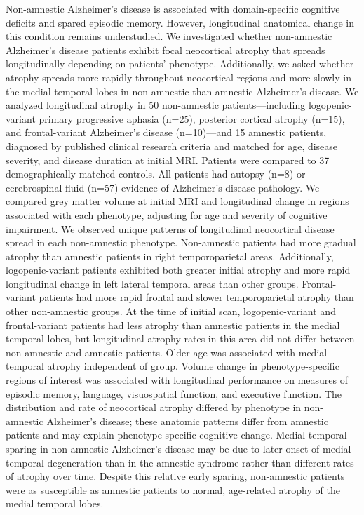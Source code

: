 \documentclass[]{article}
\begin{document}
Non-amnestic Alzheimer's disease is associated with domain-specific
cognitive deficits and spared episodic memory. However, longitudinal
anatomical change in this condition remains understudied. We
investigated whether non-amnestic Alzheimer's disease patients exhibit
focal neocortical atrophy that spreads longitudinally depending on
patients' phenotype. Additionally, we asked whether atrophy spreads more
rapidly throughout neocortical regions and more slowly in the medial
temporal lobes in non-amnestic than amnestic Alzheimer's disease. We
analyzed longitudinal atrophy in 50 non-amnestic patients---including
logopenic-variant primary progressive aphasia (n=25), posterior cortical
atrophy (n=15), and frontal-variant Alzheimer's disease (n=10)---and 15
amnestic patients, diagnosed by published clinical research criteria and
matched for age, disease severity, and disease duration at initial MRI.
Patients were compared to 37 demographically-matched controls. All
patients had autopsy (n=8) or cerebrospinal fluid (n=57) evidence of
Alzheimer's disease pathology. We compared grey matter volume at initial
MRI and longitudinal change in regions associated with each phenotype,
adjusting for age and severity of cognitive impairment. We observed
unique patterns of longitudinal neocortical disease spread in each
non-amnestic phenotype. Non-amnestic patients had more gradual atrophy
than amnestic patients in right temporoparietal areas. Additionally,
logopenic-variant patients exhibited both greater initial atrophy and
more rapid longitudinal change in left lateral temporal areas than other
groups. Frontal-variant patients had more rapid frontal and slower
temporoparietal atrophy than other non-amnestic groups. At the time of
initial scan, logopenic-variant and frontal-variant patients had less
atrophy than amnestic patients in the medial temporal lobes, but
longitudinal atrophy rates in this area did not differ between
non-amnestic and amnestic patients. Older age was associated with medial
temporal atrophy independent of group. Volume change in
phenotype-specific regions of interest was associated with longitudinal
performance on measures of episodic memory, language, visuospatial
function, and executive function. The distribution and rate of
neocortical atrophy differed by phenotype in non-amnestic Alzheimer's
disease; these anatomic patterns differ from amnestic patients and may
explain phenotype-specific cognitive change. Medial temporal sparing in
non-amnestic Alzheimer's disease may be due to later onset of medial
temporal degeneration than in the amnestic syndrome rather than
different rates of atrophy over time. Despite this relative early
sparing, non-amnestic patients were as susceptible as amnestic patients
to normal, age-related atrophy of the medial temporal lobes.
\end{document}
